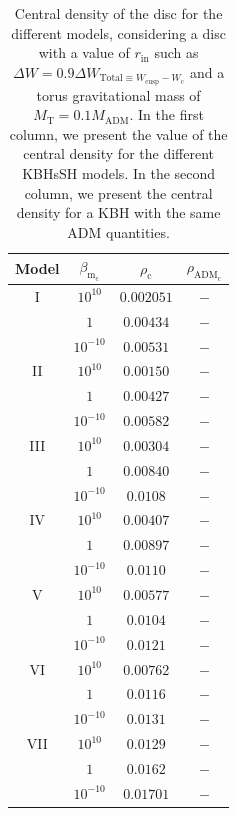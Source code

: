 \documentclass[twocolumn,aps,showpacs,showkeys,prd,superscriptaddress,byrevtex, amsmath]{revtex4-1}
\begin{document}
\begin{table}
\caption{Central density of the disc for the different models, considering a disc with a value of $r_{\mathrm{in}}$ such as $\Delta W = 0.9 \Delta W_{\mathrm{Total} \equiv W_{\mathrm{cusp}} - W_{\mathrm{c}}}$ and a torus gravitational mass of $M_{\mathrm{T}} = 0.1 M_{\mathrm{ADM}}$. In the first column, we present the value of the central density for the different KBHsSH models. In the second column, we present the central density for a KBH with the same ADM quantities.}
\label{central_density_table}      
\centering          
\begin{tabular}{c c c c }
\hline\hline       
 Model & $\beta_{\mathrm{m_{\mathrm{c}}}}$ & $\rho_{\mathrm{c}}$ & $\rho_{\mathrm{ADM_c}}$ \\ 
\hline           
I & $10^{10}$ & $0.002051$ & $-$ \\ 
 \hline 
 & $1$ & $0.00434$ & $-$ \\ 
 \hline 
 & $10^{-10}$ & $0.00531$ & $-$ \\ 
 \hline 
II & $10^{10}$ & $0.00150$ & $-$ \\ 
 \hline 
 & $1$ & $0.00427$ & $-$ \\ 
 \hline 
 & $10^{-10}$ & $0.00582$ & $-$ \\ 
 \hline 
III & $10^{10}$ & $0.00304$ & $-$ \\ 
 \hline 
 & $1$ & $0.00840$ & $-$ \\ 
 \hline 
 & $10^{-10}$ & $0.0108$ & $-$ \\ 
 \hline 
IV & $10^{10}$ & $0.00407$ & $-$ \\ 
 \hline 
 & $1$ & $0.00897$ & $-$ \\ 
 \hline 
 & $10^{-10}$ & $0.0110$ & $-$ \\ 
 \hline 
V & $10^{10}$ & $0.00577$ & $-$ \\ 
 \hline 
 & $1$ & $0.0104$ & $-$ \\ 
 \hline 
 & $10^{-10}$ & $0.0121$ & $-$ \\ 
 \hline 
VI & $10^{10}$ & $0.00762$ & $-$ \\ 
 \hline 
 & $1$ & $0.0116$ & $-$ \\ 
 \hline 
 & $10^{-10}$ & $0.0131$ & $-$ \\ 
 \hline 
VII & $10^{10}$ & $0.0129$ & $-$ \\ 
 \hline 
 & $1$ & $0.0162$ & $-$ \\ 
 \hline 
 & $10^{-10}$ & $0.01701$ & $-$ \\ 
 \hline     
\end{tabular}
\end{table}
\end{document}
